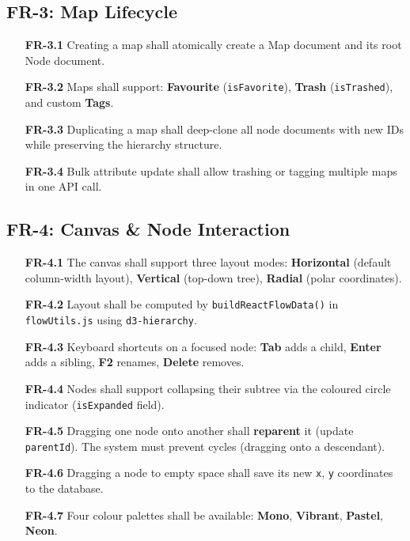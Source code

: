 \documentclass[12pt, a4paper]{article}
\begin{document}
\subsection{FR-3: Map Lifecycle}
\begin{itemize}[noitemsep, leftmargin=1.8cm]
  \item[\textbf{FR-3.1}] Creating a map shall atomically create a Map document and its root Node document.
  \item[\textbf{FR-3.2}] Maps shall support: \textbf{Favourite} (\texttt{isFavorite}), \textbf{Trash} (\texttt{isTrashed}), and custom \textbf{Tags}.
  \item[\textbf{FR-3.3}] Duplicating a map shall deep-clone all node documents with new IDs while preserving the hierarchy structure.
  \item[\textbf{FR-3.4}] Bulk attribute update shall allow trashing or tagging multiple maps in one API call.
\end{itemize}

\subsection{FR-4: Canvas \& Node Interaction}
\begin{itemize}[noitemsep, leftmargin=1.8cm]
  \item[\textbf{FR-4.1}] The canvas shall support three layout modes: \textbf{Horizontal} (default column-width layout), \textbf{Vertical} (top-down tree), \textbf{Radial} (polar coordinates).
  \item[\textbf{FR-4.2}] Layout shall be computed by \texttt{buildReactFlowData()} in \texttt{flowUtils.js} using \texttt{d3-hierarchy}.
  \item[\textbf{FR-4.3}] Keyboard shortcuts on a focused node: \textbf{Tab} adds a child, \textbf{Enter} adds a sibling, \textbf{F2} renames, \textbf{Delete} removes.
  \item[\textbf{FR-4.4}] Nodes shall support collapsing their subtree via the coloured circle indicator (\texttt{isExpanded} field).
  \item[\textbf{FR-4.5}] Dragging one node onto another shall \textbf{reparent} it (update \texttt{parentId}). The system must prevent cycles (dragging onto a descendant).
  \item[\textbf{FR-4.6}] Dragging a node to empty space shall save its new \texttt{x}, \texttt{y} coordinates to the database.
  \item[\textbf{FR-4.7}] Four colour palettes shall be available: \textbf{Mono}, \textbf{Vibrant}, \textbf{Pastel}, \textbf{Neon}.
\end{itemize}
\end{document}
